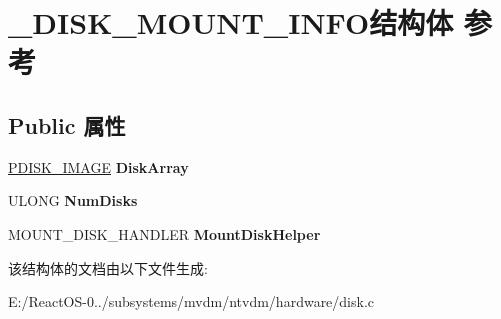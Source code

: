 \hypertarget{struct___d_i_s_k___m_o_u_n_t___i_n_f_o}{}\section{\+\_\+\+D\+I\+S\+K\+\_\+\+M\+O\+U\+N\+T\+\_\+\+I\+N\+F\+O结构体 参考}
\label{struct___d_i_s_k___m_o_u_n_t___i_n_f_o}
\subsection*{Public 属性}
\begin{DoxyCompactItemize}
\item 
\mbox{\label{struct___d_i_s_k___m_o_u_n_t___i_n_f_o_a080d5a6bcf9ae813b4e2e2b20785a4b7}} 
\hyperlink{struct___d_i_s_k___i_m_a_g_e}{P\+D\+I\+S\+K\+\_\+\+I\+M\+A\+GE} {\bfseries Disk\+Array}
\item 
\mbox{\label{struct___d_i_s_k___m_o_u_n_t___i_n_f_o_ae5f8728ed91cff8447a292daca24b8bd}} 
U\+L\+O\+NG {\bfseries Num\+Disks}
\item 
\mbox{\label{struct___d_i_s_k___m_o_u_n_t___i_n_f_o_ac9afaf03d1bacb3fc5246705f7ea514f}} 
M\+O\+U\+N\+T\+\_\+\+D\+I\+S\+K\+\_\+\+H\+A\+N\+D\+L\+ER {\bfseries Mount\+Disk\+Helper}
\end{DoxyCompactItemize}


该结构体的文档由以下文件生成\+:\begin{DoxyCompactItemize}
\item 
E\+:/\+React\+O\+S-\/0../subsystems/mvdm/ntvdm/hardware/disk.\+c\end{DoxyCompactItemize}
